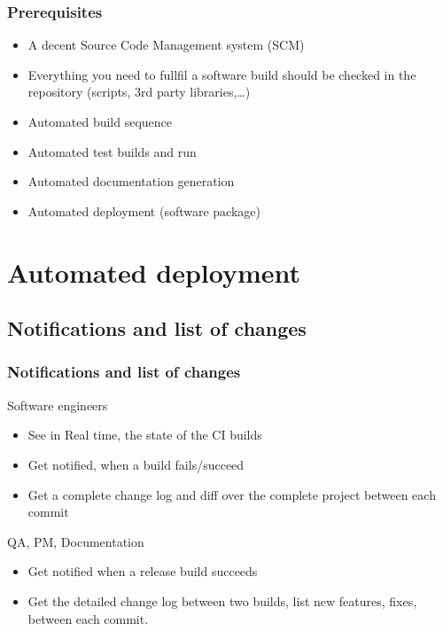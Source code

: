 \documentclass[handout]{beamer}
\begin{document}
\begin{frame}
\frametitle{Prerequisites}

\begin{itemize}
  \item<1-> A decent Source Code Management system (SCM)\cite{Berczuk03}
  \item<2-> Everything you need to fullfil a software build should be checked in
  the repository\cite{Berczuk03} (scripts, 3rd party libraries,\ldots)
  \item<3-> Automated build sequence
  \item<4-> Automated test builds and run
  \item<5-> Automated documentation generation
  \item<6-> Automated deployment (software package)  
\end{itemize}

\end{frame}

\section[Automated deployment]{Automated deployment}
\subsection[Notifications and list of changes]{Notifications and list of
changes}
\begin{frame}
\frametitle{Notifications and list of changes}
{
\begin{block}{Software engineers}
   \begin{itemize}
     \item<1-> See in Real time, the state of the CI builds
     \item<2-> Get notified, when a build fails/succeed
     \item<3-> Get a complete change log and diff over the complete
     project between each commit
   \end{itemize}
 \end{block}
}
{
\begin{block}{QA, PM, Documentation}
   \begin{itemize}
     \item<4-> Get notified when a release build succeeds
     \item<5-> Get the detailed change log between two builds, list new
     features, fixes, between each commit.
   \end{itemize}
 \end{block}
}

\end{frame}
\end{document}

